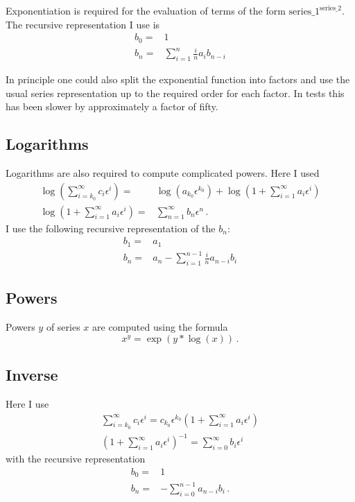 \documentclass{article}
\begin{document}
Exponentiation is required for the evaluation of terms of the form
$\text{series\_1}^{\text{series\_2}}$.
The recursive representation I use is
\begin{align}
  \label{eq:exp_rec}
b_0=&1\\
b_n =&  \sum_{i=1}^{n} \frac{i}{n} a_{i}b_{n-i}
\end{align}

In principle one could also split the exponential function into factors
and use the usual series representation up to the required order for
each factor. In tests this has been slower by approximately a factor of fifty.

\subsection{Logarithms}
\label{sec:impl_log}

Logarithms are also required to compute complicated powers. Here I used
\begin{align}
  \label{eq:log}
\log\left(\sum_{i=k_0}^{\infty}c_i \epsilon^i\right)=&\log\left(a_{k_0}\epsilon^{k_0}\right)+\log\left(1+\sum_{i=1}^{\infty}a_i \epsilon^i\right)\\
\log\left(1+\sum_{i=1}^{\infty}a_i \epsilon^i\right)=&\sum_{n=1}^\infty
b_n\epsilon^n\,.
\end{align}
I use the following recursive representation of the $b_n$:
\begin{align}
  \label{eq:log_rec}
b_1=&a_1\\
b_n =& a_n - \sum_{i=1}^{n-1} \frac{i}{n} a_{n-i}b_{i}
\end{align}

\subsection{Powers}
\label{sec:impl_pow}

Powers $y$ of series $x$ are computed using the formula
\begin{equation}
  \label{eq:pow}
  x^y=\exp(y*\log(x))\,.
\end{equation}


\subsection{Inverse}
\label{sec:impl_inverse}

Here I use
\begin{align}
  \label{eq:inv}
  \sum_{i=k_0}^{\infty}c_i
    \epsilon^i=c_{k_0}\epsilon^{k_0}\left(1+\sum_{i=1}^{\infty}a_i
    \epsilon^i\right)\\
\left(1+\sum_{i=1}^{\infty}a_i \epsilon^i\right)^{-1}=\sum_{i=0}^{\infty}b_i \epsilon^i
\end{align}
with the recursive representation
\begin{align}
  \label{eq:inv_rec}
  b_0=&1\\
  b_n=&-\sum_{i=0}^{n-1} a_{n-i}b_i \,.
\end{align}
\end{document}
